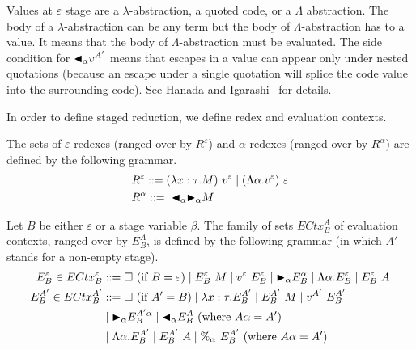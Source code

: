 Values at $\varepsilon$ stage are a $\lambda$-abstraction, a quoted code,
or a $\Lambda$ abstraction.  The body of a $\lambda$-abstraction can
be any term but the body of $\Lambda$-abstraction has to a value.  It
means that the body of $\Lambda$-abstraction must be evaluated.  The
side condition for ${\mathop{\blacktriangleleft}}_\alpha v^{A'}$ means that escapes in a value
can appear only under nested quotations (because an escape under a
single quotation will splice the code value into the surrounding
code).  See Hanada and Igarashi~\cite{Hanada2014} for details.

In order to define staged reduction, we define redex and evaluation contexts.

\begin{definition}[Redex]
  The sets of $\varepsilon$-redexes (ranged over by $R^\varepsilon$) and $\alpha$-redexes (ranged over by $R^\alpha$) are defined by the following grammar.
  \begin{align*}
     & R^\varepsilon ::= (\lambda x:\tau.M)\ v^\varepsilon \mid (\Lambda\alpha.v^\varepsilon)\ \varepsilon \\
     & R^\alpha      ::=\ {\mathop{\blacktriangleleft}}_\alpha {\mathop{\blacktriangleright}}_\alpha M                                                         \\
  \end{align*}
\end{definition}

\begin{definition}
  Let $B$ be either \(\varepsilon\) or a stage variable \(\beta\).
  The family of sets $ECtx^A_B$ of evaluation contexts, ranged over by $E^A_B$, is defined by the following grammar (in which $A'$ stands for a non-empty stage).
  \begin{align*}
    E^\varepsilon_B \in ECtx^\varepsilon_B & ::= \square\ (\text{if\ } B = \varepsilon)
    \mid E^\varepsilon_B\ M \mid v^\varepsilon\ E^\varepsilon_B \mid {\mathop{\blacktriangleright}}_\alpha E^\alpha_B
    \mid \Lambda\alpha.E^\varepsilon_B \mid E^\varepsilon_B\ A                                                                                    \\
    E^{A'}_B \in ECtx^{A'}_B               & ::= \square\ (\text{if } A' = B) \mid \lambda x:\tau.E^{A'}_B \mid E^{A'}_B\ M \mid v^{A'}\ E^{A'}_B \\
                                           & \mid {\mathop{\blacktriangleright}}_\alpha E^{A'\alpha}_B \mid {\mathop{\blacktriangleleft}}_\alpha E^{A}_B \ (\text{where } A\alpha = A')               \\
                                           & \mid \Lambda\alpha.E^{A'}_B \mid E^{A'}_B\ A \mid \%_\alpha\ E^{A'}_B \ (\text{where } A\alpha = A')
  \end{align*}
\end{definition}

